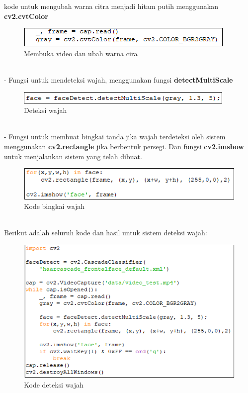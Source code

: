 kode untuk mengubah warna citra menjadi hitam putih menggunakan \textbf{cv2.cvtColor}
\begin{figure}[h!]
    \centering
    \includegraphics[width=0.7\linewidth]{images/4.PNG}
    \caption{Membuka video dan ubah warna cira}
\end{figure}
\\- Fungsi untuk mendeteksi wajah, menggunakan fungsi \textbf{detectMultiScale}
\begin{figure}[h!]
    \centering
    \includegraphics[width=0.7\linewidth]{images/5.PNG}
    \caption{Deteksi wajah}
\end{figure}
\\- Fungsi untuk membuat bingkai tanda jika wajah terdeteksi oleh sistem menggunakan \textbf{cv2.rectangle} jika berbentuk persegi. Dan fungsi \textbf{cv2.imshow} untuk menjalankan sistem yang telah dibuat.
\begin{figure}[h!]
    \centering
    \includegraphics[width=0.75\linewidth]{images/6.PNG}
    \caption{Kode bingkai wajah}
\end{figure}
\\Berikut adalah seluruh kode dan hasil untuk sistem deteksi wajah:
\begin{figure}[h!]
    \centering
    \includegraphics[width=0.75\linewidth]{images/full.PNG}
    \caption{Kode deteksi wajah}
\end{figure}
